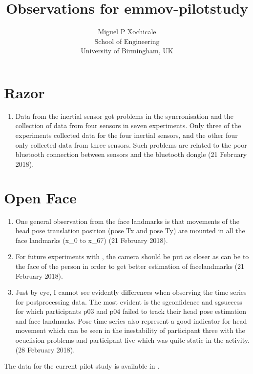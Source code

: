 \documentclass[a4paper,12pt]{article}
\title{Observations for emmov-pilotstudy}
\author{Miguel P Xochicale \\
School of Engineering\\
University of Birmingham, UK}
\begin{document}
\maketitle




\section{Razor}

\begin{enumerate}
\item Data from the inertial sensor got problems in the syncronisation
	and the collection of data from four sensors in seven experiments.
	Only three of the experiments collected data for the four inertial sensors, 
	and the other four only collected data from three sensors. Such problems 
	are related to the poor bluetooth connection between sensors and 
	the bluetooth dongle (21 February 2018).

\end{enumerate}


\section{Open Face}

\begin{enumerate}
\item One general observation from the face landmarks is that 
	movements of the head pose translation position (pose Tx and pose Ty) 
	are mounted in all the face landmarks (x\_0 to x\_67) (21 February 2018).

\item For future experiments with \cite{baltrusaitis2016}, the camera 
	should be put as closer as can be to the face of the person 
	in order to get better estimation of facelandmarks (21 February 2018).

\item Just by eye, I cannot see evidently differences when observing the time series for
 	postprocessing data. The most evident is the sgconfidence and sgsuccess for which
 	participants p03 and p04 failed to track their head pose estimation and face landmarks.
 	Pose time series also represent a good indicator for head movement which can be seen
	in the inestability of  participant three with the ocuclision problems and
 	participant five which was quite  static in the activity.
	(28 February 2018).



\end{enumerate}


The data for the current pilot study is available in \cite{mxochicale2018}.












\end{document}
